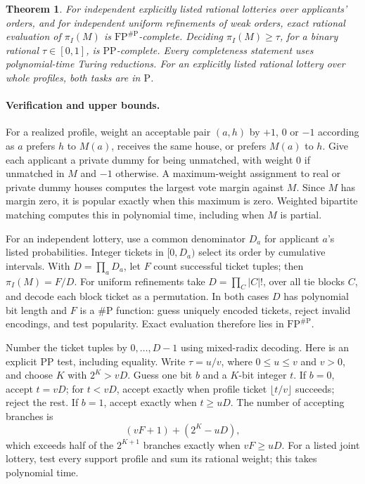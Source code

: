\documentclass[11pt]{article}
\newtheorem{theorem}{Theorem}
\newcommand{\PP}{\mathrm{PP}}
\newcommand{\FP}{\mathrm{FP}}
\newcommand{\sharpP}{\#\mathrm P}
\begin{document}
\begin{theorem}\label{thm:main}
For independent explicitly listed rational lotteries over applicants' orders, and for independent uniform refinements of weak orders, exact rational evaluation of $\pi_I(M)$ is $\FP^{\sharpP}$-complete. Deciding $\pi_I(M)\geq\tau$, for a binary rational $\tau\in[0,1]$, is $\PP$-complete. Every completeness statement uses polynomial-time Turing reductions. For an explicitly listed rational lottery over whole profiles, both tasks are in $\mathrm P$.
\end{theorem}

\paragraph{Verification and upper bounds.}
For a realized profile, weight an acceptable pair $(a,h)$ by $+1$, $0$ or $-1$ according as $a$ prefers $h$ to $M(a)$, receives the same house, or prefers $M(a)$ to $h$. Give each applicant a private dummy for being unmatched, with weight $0$ if unmatched in $M$ and $-1$ otherwise. A maximum-weight assignment to real or private dummy houses computes the largest vote margin against $M$. Since $M$ has margin zero, it is popular exactly when this maximum is zero. Weighted bipartite matching computes this in polynomial time, including when $M$ is partial.

For an independent lottery, use a common denominator $D_a$ for applicant $a$'s listed probabilities. Integer tickets in $[0,D_a)$ select its order by cumulative intervals. With $D=\prod_aD_a$, let $F$ count successful ticket tuples; then $\pi_I(M)=F/D$. For uniform refinements take $D=\prod_C |C|!$, over all tie blocks $C$, and decode each block ticket as a permutation. In both cases $D$ has polynomial bit length and $F$ is a $\sharpP$ function: guess uniquely encoded tickets, reject invalid encodings, and test popularity. Exact evaluation therefore lies in $\FP^{\sharpP}$.

Number the ticket tuples by $0,\ldots,D-1$ using mixed-radix decoding. Here is an explicit $\PP$ test, including equality. Write $\tau=u/v$, where $0\leq u\leq v$ and $v>0$, and choose $K$ with $2^K>vD$. Guess one bit $b$ and a $K$-bit integer $t$. If $b=0$, accept $t=vD$; for $t<vD$, accept exactly when profile ticket $\lfloor t/v\rfloor$ succeeds; reject the rest. If $b=1$, accept exactly when $t\geq uD$. The number of accepting branches is
\[
 (vF+1)+(2^K-uD),
\]
which exceeds half of the $2^{K+1}$ branches exactly when $vF\geq uD$. For a listed joint lottery, test every support profile and sum its rational weight; this takes polynomial time.
\end{document}
